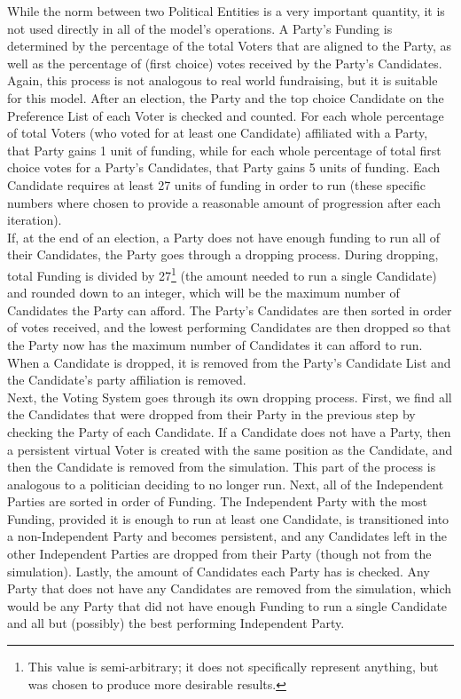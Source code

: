 \documentclass[12pt]{article}
\newcounter{step}
\begin{document}
\qquad While the norm between two Political Entities is a very important quantity, it is not used directly in all of the model's operations. A Party's Funding is determined by the percentage of the total Voters that are aligned to the Party, as well as the percentage of (first choice) votes received by the Party's Candidates. Again, this process is not analogous to real world fundraising, but it is suitable for this model. After an election, the Party and the top choice Candidate on the Preference List of each Voter is checked and counted. For each whole percentage of total Voters (who voted for at least one Candidate) affiliated with a Party, that Party gains 1 unit of funding, while for each whole percentage of total first choice votes for a Party's Candidates, that Party gains 5 units of funding. Each Candidate requires at least 27 units of funding in order to run (these specific numbers where chosen to provide a reasonable amount of progression after each iteration). \\

\qquad If, at the end of an election, a Party does not have enough funding to run all of their Candidates, the Party goes through a dropping process. During dropping, total Funding is divided by 27\footnote{This value is semi-arbitrary; it does not specifically represent anything, but was chosen to produce more desirable results.} (the amount needed to run a single Candidate) and rounded down to an integer, which will be the maximum number of Candidates the Party can afford. The Party's Candidates are then sorted in order of votes received, and the lowest performing Candidates are then dropped so that the Party now has the maximum number of Candidates it can afford to run. When a Candidate is dropped, it is removed from the Party's Candidate List and the Candidate's party affiliation is removed. \\

\qquad Next, the Voting System goes through its own dropping process. First, we find all the Candidates that were dropped from their Party in the previous step by checking the Party of each Candidate. If a Candidate does not have a Party, then a persistent virtual Voter is created with the same position as the Candidate, and then the Candidate is removed from the simulation. This part of the process is analogous to a politician deciding to no longer run. Next, all of the Independent Parties are sorted in order of Funding. The Independent Party with the most Funding, provided it is enough to run at least one Candidate, is transitioned into a non-Independent Party and becomes persistent, and any Candidates left in the other Independent Parties are dropped from their Party (though not from the simulation). Lastly, the amount of Candidates each Party has is checked. Any Party that does not have any Candidates are removed from the simulation, which would be any Party that did not have enough Funding to run a single Candidate and all but (possibly) the best performing Independent Party. \\
\end{document}
